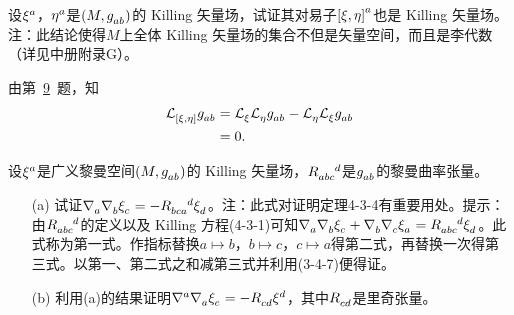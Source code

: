\begin{xiti}
    \item 设$\tensor{\xi}{^a}$，$\tensor{\eta}{^a}$是$\left( M , \tensor{g}{_a_b}\right)$的 Killing 矢量场，试证其对易子$\tensor{\left[ \xi,\eta \right]}{^a}$也是 Killing 矢量场。注：此结论使得$M$上全体 Killing 矢量场的集合不但是矢量空间，而且是李代数（详见中册附录G）。

    \begin{zm}
    	由第~\hyperlink{4.9}{9}~题，知
    	\begin{align*}
    	\Ld{\left[\xi,\eta\right]} \tensor{g}{_a_b} &= \Ld{\xi} \Ld{\eta} \tensor{g}{_a_b} -\Ld{\eta} \Ld{\xi} \tensor{g}{_a_b} \\
    	&=0.
    	\end{align*}
    \end{zm}
	
	\item 设$\tensor{\xi}{^a}$是广义黎曼空间$\left(M, \tensor{g}{_a_b} \right)$的 Killing 矢量场，$\tensor{R}{_a_b_c^d}$是$\tensor{g}{_a_b}$的黎曼曲率张量。
	\begin{enumerate}
		\item[(a)] 试证$\Nabla{a}\Nabla{b}\tensor{\xi}{_c} = - \tensor{R}{_b_c_a^d}\tensor{\xi}{_d} $。注：此式对证明定理4-3-4有重要用处。提示：由$\tensor{R}{_a_b_c^d}$的定义以及 Killing 方程(4-3-1)可知$\Nabla{a} \Nabla{b} \tensor{\xi}{_c} + \Nabla{b} \Nabla{c} \tensor{\xi}{_a} = \tensor{R}{_a_b_c^d} \tensor{\xi}{_d} $。此式称为第一式。作指标替换$a\mapsto b$，$b\mapsto c$，$c\mapsto a$得第二式，再替换一次得第三式。以第一、第二式之和减第三式并利用(3-4-7)便得证。
		\item[(b)] 利用(a)的结果证明$\tensor{\nabla}{^a} \Nabla{a} \tensor{\xi}{_c} = - \tensor{R}{_c_d} \tensor{\xi}{^d} $，其中$\tensor{R}{_c_d}$是里奇张量。
	\end{enumerate}
	

\end{xiti}
